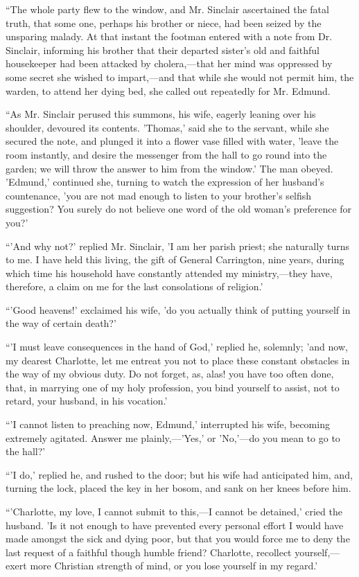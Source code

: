 ``The whole party flew to the window,
and Mr. Sinclair ascertained the fatal truth, that some one, perhaps his
brother or niece, had been seized by the unsparing malady. At that
instant the footman entered with a note from Dr. Sinclair, informing his
brother that their departed sister's old and faithful housekeeper had
been attacked by cholera,—that her mind was oppressed by some secret
she wished to impart,—and that while she would not permit him, the
warden, to attend her dying bed, she called out repeatedly for Mr.
Edmund.

``As Mr. Sinclair perused this
summons, his wife, eagerly leaning over his shoulder, devoured its
contents. 'Thomas,' said she to the servant, while she secured the note,
and plunged it into a flower vase filled with water, 'leave the room
instantly, and desire the messenger from the hall to go round into the
garden; we will throw the answer to him from the window.' The man
obeyed. 'Edmund,' continued she, turning to watch the expression of her
husband's countenance, 'you are not mad enough to listen to your brother's
selfish suggestion? You surely do not believe one word of the old woman's
preference for you?'

``'And why not?' replied Mr.
Sinclair, 'I am her parish priest; she naturally turns to me. I have
held this living, the gift of General Carrington, nine years, during
which time his household have constantly attended my ministry,—they
have, therefore, a claim on me for the last consolations of religion.'

``'Good heavens!' exclaimed his wife,
'do you actually think of putting yourself in the way of certain death?'

``'I must leave consequences in the
hand of God,' replied he, solemnly; 'and now, my dearest Charlotte, let
me entreat you not to place these constant obstacles in the way of my
obvious duty. Do not forget, as, alas! you have too often done, that, in
marrying one of my holy profession, you bind yourself to assist, not to
retard, your husband, in his vocation.'

``'I cannot listen to preaching now,
Edmund,' interrupted his wife, becoming
extremely agitated. Answer me plainly,—'Yes,' or 'No,'—do you mean
to go to the hall?'

``'I do,' replied he, and rushed to
the door; but his wife had anticipated him, and, turning the lock,
placed the key in her bosom, and sank on her knees before him.

``'Charlotte, my love, I cannot
submit to this,—I cannot be detained,' cried the husband. 'Is it not
enough to have prevented every personal effort I would have made amongst
the sick and dying poor, but that you would force me to deny the last
request of a faithful though humble friend? Charlotte, recollect
yourself,—exert more Christian strength of mind, or you lose yourself
in my regard.'

